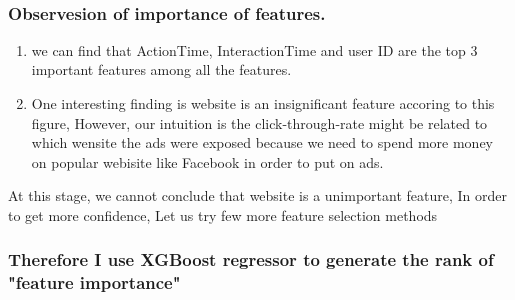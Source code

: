 \documentclass[11pt]{article}
\providecommand{\tightlist}{%
      \setlength{\itemsep}{0pt}\setlength{\parskip}{0pt}}
\begin{document}
    \begin{center}
    \end{center}
    { \hspace*{\fill} \\}
    
    \subsubsection{Observesion of importance of
features.}\label{observesion-of-importance-of-features.}

\begin{enumerate}
\def\labelenumi{\arabic{enumi}.}
\tightlist
\item
  we can find that ActionTime, InteractionTime and user ID are the top 3
  important features among all the features.\\
\item
  One interesting finding is website is an insignificant feature
  accoring to this figure, However, our intuition is the
  click-through-rate might be related to which wensite the ads were
  exposed because we need to spend more money on popular webisite like
  Facebook in order to put on ads.
\end{enumerate}

At this stage, we cannot conclude that website is a unimportant feature,
In order to get more confidence, Let us try few more feature selection
methods

    \subsubsection{Therefore I use XGBoost regressor to generate the rank of
"feature
importance"}\label{therefore-i-use-xgboost-regressor-to-generate-the-rank-of-feature-importance}
\end{document}
